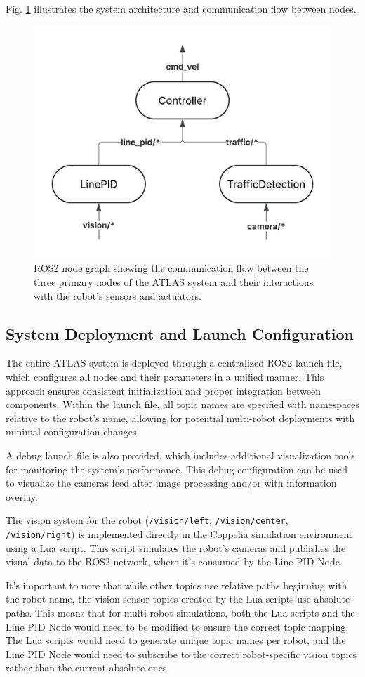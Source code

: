 \documentclass[9pt,technote]{IEEEtran}
\begin{document}
Fig. \ref{fig:system_architecture} illustrates the system architecture and communication flow between nodes.

\begin{figure}[H]
    \centering
    \includegraphics[width=0.6\columnwidth]{figures/architecture.jpeg}
    \caption{ROS2 node graph showing the communication flow between the three primary nodes of the ATLAS system and their interactions with the robot's sensors and actuators.}
    \label{fig:system_architecture}
\end{figure}

\subsection{System Deployment and Launch Configuration}
The entire ATLAS system is deployed through a centralized ROS2 launch file, which configures all nodes and their parameters in a unified manner. This approach ensures consistent initialization and proper integration between components. Within the launch file, all topic names are specified with namespaces relative to the robot's name, allowing for potential multi-robot deployments with minimal configuration changes.

A debug launch file is also provided, which includes additional visualization tools for monitoring the system's performance. This debug configuration can be used to visualize the cameras feed after image processing and/or with information overlay.

The vision system for the robot (\texttt{/vision/left}, \texttt{/vision/center}, \texttt{/vision/right}) is implemented directly in the Coppelia simulation environment using a Lua script. This script simulates the robot's cameras and publishes the visual data to the ROS2 network, where it's consumed by the Line PID Node. 

It's important to note that while other topics use relative paths beginning with the robot name, the vision sensor topics created by the Lua scripts use absolute paths. This means that for multi-robot simulations, both the Lua scripts and the Line PID Node would need to be modified to ensure the correct topic mapping. The Lua scripts would need to generate unique topic names per robot, and the Line PID Node would need to subscribe to the correct robot-specific vision topics rather than the current absolute ones.
\end{document}
